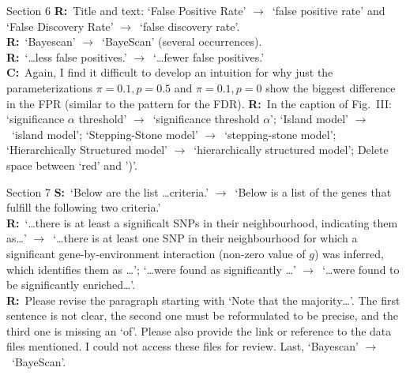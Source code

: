 \documentclass[11pt]{article}
\newenvironment{my_description}
{\begin{description}
  \setlength{\itemsep}{2pt}
  \setlength{\parskip}{0pt}
  \setlength{\parsep}{0pt}}
{\end{description}}
\newcommand{\ra}{$\rightarrow$\ }
\newcommand{\C}{\textbf{C:}\ }
\newcommand{\R}{\textbf{R:}\ }
\newcommand{\V}{\textbf{S:}\ }
\begin{document}
\begin{my_description}
	\item[Section 6] \R Title and text: `False Positive Rate' \ra `false positive rate' and `False Discovery Rate' \ra `false discovery rate'.\\
	\R `Bayescan' \ra `BayeScan' (several occurrences).\\
	\R `\dots less false positives.' \ra `\dots fewer false positives.'\\
	\C Again, I find it difficult to develop an intuition for why just the parameterizations $\pi = 0.1, p = 0.5$ and $\pi = 0.1, p = 0$ show the biggest difference in the FPR (similar to the pattern for the FDR).
	\R In the caption of Fig.\ III: `significance $\alpha$ threshold' \ra `significance threshold $\alpha$'; `Island model' \ra `island model'; `Stepping-Stone model' \ra `stepping-stone model'; `Hierarchically Structured model' \ra `hierarchically structured model'; Delete space between `red' and ')'.\\
	
	\item[Section 7] \V `Below are the list \dots criteria.' \ra `Below is a list of the genes that fulfill the following two criteria.'\\
	\R `\dots there is at least a significalt SNPs in their neighbourhood, indicating them as\dots' \ra `\dots there is at least one SNP in their neighbourhood for which a significant gene-by-environment interaction (non-zero value of $g$) was inferred, which identifies them as \dots'; `\dots were found as significantly \dots' \ra `\dots were found to be significantly enriched\dots'.\\
	\R Please revise the paragraph starting with `Note that the majority\dots'. The first sentence is not clear, the second one must be reformulated to be precise, and the third one is missing an `of'. Please also provide the link or reference to the data files mentioned. I could not access these files for review. Last, `Bayescan' \ra `BayeScan'.
	

\end{my_description}
\end{document}
